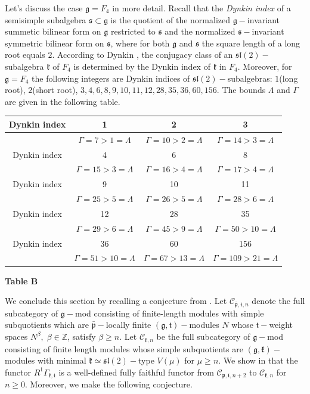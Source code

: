 \documentclass[default]{./styles/svmult}
\renewcommand{\gg}{\mathfrak{g}}
\newcommand{\kk}{\mathfrak{k}}
\newcommand{\pp}{\mathfrak{p}}
\renewcommand{\ss}{\mathfrak{s}}
\renewcommand{\tt}{\mathfrak{t}}
\renewcommand{\sl}{\mathfrak{sl}}
\begin{document}
Let's discuss the case $\gg = F_4$ in more detail. Recall that the \textit{Dynkin index} of a semisimple subalgebra $\ss \subset \gg$ is the quotient of the normalized $\gg-$invariant summetic bilinear form on $\gg$ restricted to $\ss$ and the normalized $\ss-$invariant symmetric bilinear form on $\ss$, where for both $\gg$ and $\ss$ the square length of a long root equals $2$. According to Dynkin \cite{D}, the conjugacy class of an $\sl(2)-$subalgebra $\kk$ of $F_4$ is determined by the Dynkin index of $\kk$ in $F_4$. Moreover, for $\gg = F_4$ the following integers are Dynkin indices of $\sl(2)-$subalgebras: $1$(long root), $2$(short root), $3,4,6,8,9,10,11,12,28,35,36,60,156.$ The bounds $\Lambda$ and $\Gamma$ are given in the following table.

\begin{table}[ht]
\begin{center}
\begin{tabular}{|c|c|c|c|}\hline
Dynkin index & 1 & 2 & 3\\\hline 
  & $\Gamma = 7 > 1 =\Lambda$ & $\Gamma = 10 > 2 =\Lambda$ & $\Gamma = 14 > 3 =\Lambda$\\\hline
Dynkin index & 4 & 6 & 8\\\hline
  & $\Gamma = 15 > 3 =\Lambda$ & $\Gamma = 16 > 4 =\Lambda$ & $\Gamma = 17 > 4 =\Lambda$\\\hline
Dynkin index & 9 & 10 & 11\\\hline
  & $\Gamma = 25 > 5 =\Lambda$ & $\Gamma = 26 > 5 =\Lambda$ & $\Gamma = 28 > 6 =\Lambda$\\\hline
Dynkin index & 12 & 28 & 35\\\hline
  & $\Gamma = 29 > 6 =\Lambda$ & $\Gamma = 45 > 9 =\Lambda$ & $\Gamma = 50 > 10 =\Lambda$\\\hline
Dynkin index & 36 & 60 & 156\\\hline
  & $\Gamma = 51 > 10 =\Lambda$ & $\Gamma = 67 > 13 =\Lambda$ & $\Gamma = 109 > 21 =\Lambda$\\\hline
\end{tabular}
\end{center}
\end{table}

\newpage

\begin{center}
 \textbf{Table B}
\end{center}

\vspace{0.5cm}

We conclude this section by recalling a conjecture from \cite{PZ5}. Let $\mathcal{C}_{\bar{\pp},\tt,n}$ denote the full subcategory of $\gg-$mod consisting of finite-length modules with simple subquotients which are $\bar{\pp}-$locally finite $(\gg,\tt)-$modules $N$ whose $\tt-$weight spaces $N^{\beta},\;\beta \in \mathbb{Z}$, satisfy $\beta \geq n$. Let $\mathcal{C}_{\kk,n}$ be the full subcategory of $\gg-$mod consisting of finite length modules whose simple subquotients are $(\gg,\kk)-$modules with minimal $\kk \simeq \sl(2)-$type $V(\mu)$ for $\mu \geq n$. We show in \cite{PZ5} that the functor $R^{1}\Gamma_{\kk,\tt}$ is a well-defined fully faithful functor from $\mathcal{C}_{\pp,\tt,n+2}$ to $\mathcal{C}_{\kk,n}$ for $n \geq 0$. Moreover, we make the following conjecture.
\end{document}

